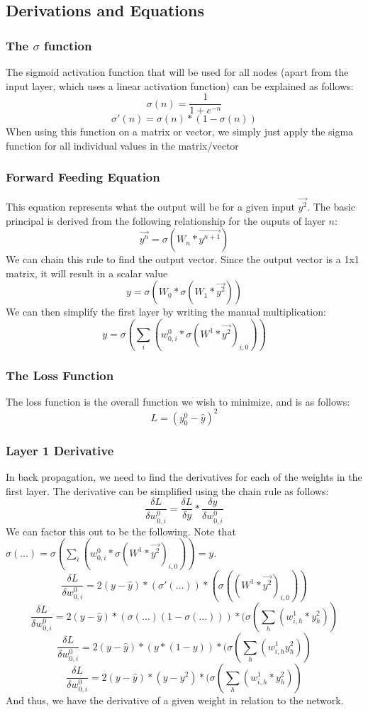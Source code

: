 \documentclass[10pt]{article}
\begin{document}
\subsection{Derivations and Equations}

\subsubsection{The $\sigma$ function}
The sigmoid activation function that will be used for all nodes (apart from the input layer, which uses a linear activation function) can be explained as follows:
$$\sigma(n) = \frac{1}{1 + e^{-n}}$$
$$\sigma'(n) = \sigma(n) * (1 - \sigma(n))$$
When using this function on a matrix or vector, we simply just apply the sigma function for all individual values in the matrix/vector

\subsubsection{Forward Feeding Equation}
This equation represents what the output will be for a given input $\vec{y^2}$. The basic principal is derived from the following relationship for the ouputs of layer $n$:
$$\vec{y^n} = \sigma(W_{n} * \vec{y^{n+1}})$$
We can chain this rule to find the output vector. Since the output vector is a 1x1 matrix, it will result in a scalar value
$$y = \sigma(W_0 * \sigma(W_1 * \vec{y^2}))$$
We can then simplify the first layer by writing the manual multiplication:
$$y = \sigma(\sum_i{(w^0_{0,i} * \sigma(W^1 * \vec{y^2})_{i,0})})$$
\subsubsection{The Loss Function}
The loss function is the overall function we wish to minimize, and is as follows:
$$L = (y^0_0 - \hat{y})^2$$

\subsubsection{Layer 1 Derivative}
In back propagation, we need to find the derivatives for each of the weights in the first layer. The derivative can be simplified using the chain rule as follows:
$$\frac{\delta L}{\delta w^0_{0,i}} = \frac{\delta L}{\delta y} * \frac{\delta y}{\delta w^0_{0,i}}$$
We can factor this out to be the following. Note that $\sigma(\ldots) = \sigma(\sum_i{(w^0_{0,i} * \sigma(W^1 * \vec{y^2})_{i,0})}) = y$.
$$\frac{\delta L}{\delta w^0_{0,i}} = 2(y - \hat{y}) * (\sigma'(\ldots)) * (\sigma((W^1 * \vec{y^2})_{i,0}))$$
$$\frac{\delta L}{\delta w^0_{0,i}} = 2(y - \hat{y}) * (\sigma(\ldots)(1 - \sigma(\ldots))) * (\sigma(\sum_h{(w^1_{i,h}* y^2_{h})})$$
$$\frac{\delta L}{\delta w^0_{0,i}} = 2(y - \hat{y}) * (y * (1 - y)) * (\sigma(\sum_h{(w^1_{i,h} y^2_{h})})$$
$$\frac{\delta L}{\delta w^0_{0,i}} = 2(y - \hat{y}) * (y - y^2) *  (\sigma(\sum_h{(w^1_{i,h} *y^2_{h})})$$
And thus, we have the derivative of a given weight in relation to the network.
\end{document}
